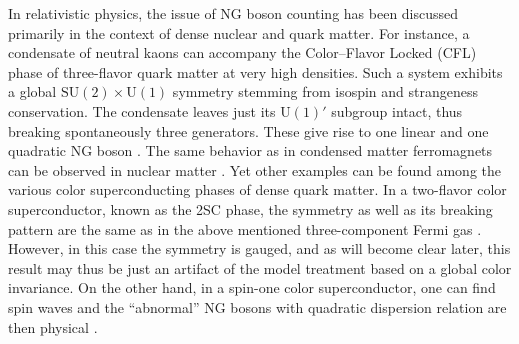 \documentclass[final,3p,times,12pt,a4paper,sort&compress]{elsarticle}
\newcommand\gr[1]{\mathrm{#1}}              %
\begin{document}
In relativistic physics, the issue of NG boson counting has been discussed
primarily in the context of dense nuclear and quark matter. For instance, a
condensate of neutral kaons can accompany the Color--Flavor Locked (CFL) phase
of three-flavor quark matter at very high densities. Such a system exhibits a
global $\gr{SU(2)\times U(1)}$ symmetry stemming from isospin and strangeness
conservation. The condensate leaves just its $\gr{U(1)}'$ subgroup intact,
thus breaking spontaneously three generators. These give rise to one linear and
one quadratic NG boson
\cite{Schafer:2001bq,Miransky:2001tw,Andersen:2006ys}. The same behavior
as in condensed matter ferromagnets can be observed in nuclear matter
\cite{Beraudo:2004zr}. Yet other examples can be found among the various color
superconducting phases of dense quark matter. In a two-flavor color
superconductor, known as the 2SC phase, the symmetry as well as its breaking
pattern are the same as in the above mentioned three-component Fermi gas
\cite{Blaschke:2004cs}. However, in this case the symmetry is gauged, and
as will become clear later, this result may thus be just an artifact of the
model treatment based on a global color invariance. On the other hand, in a
spin-one color superconductor, one can find spin waves and the ``abnormal'' NG
bosons with quadratic dispersion relation are then physical
\cite{Buballa:2002wy}.
\end{document}
